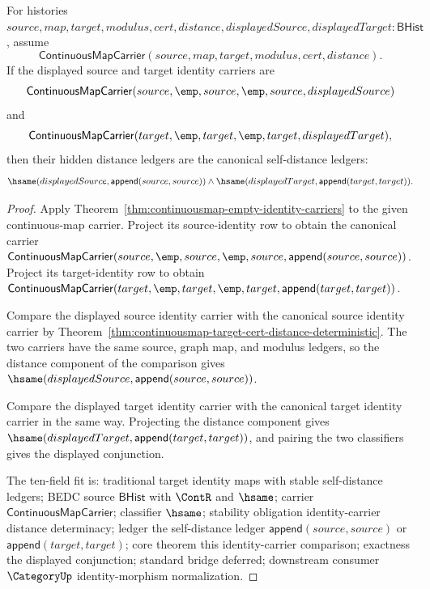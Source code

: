 \begin{theorem}
\label{thm:continuousmap-identity-carrier-distance-determinacy}
For histories
$source,map,target,modulus,cert,distance,displayedSource,displayedTarget:\mathsf{BHist}$,
assume
$$
\mathsf{ContinuousMapCarrier}(source,map,target,modulus,cert,distance).
$$
If the displayed source and target identity carriers are
$$
\mathsf{ContinuousMapCarrier}
(source,\emp,source,\emp,source,displayedSource)
$$
and
$$
\mathsf{ContinuousMapCarrier}
(target,\emp,target,\emp,target,displayedTarget),
$$
then their hidden distance ledgers are the canonical self-distance ledgers:
$$
\hsame(displayedSource,\mathsf{append}(source,source))\land
\hsame(displayedTarget,\mathsf{append}(target,target)).
$$
\end{theorem}
\begin{proof}
Apply Theorem~\ref{thm:continuousmap-empty-identity-carriers}
to the given continuous-map carrier. Project its source-identity row to obtain
the canonical carrier
$\mathsf{ContinuousMapCarrier}(source,\emp,source,\emp,source,\mathsf{append}(source,source))$.
Project its target-identity row to obtain
$\mathsf{ContinuousMapCarrier}(target,\emp,target,\emp,target,\mathsf{append}(target,target))$.

Compare the displayed source identity carrier with the canonical source identity
carrier by Theorem~\ref{thm:continuousmap-target-cert-distance-deterministic}.
The two carriers have the same source, graph map, and modulus ledgers, so the
distance component of the comparison gives
$\hsame(displayedSource,\mathsf{append}(source,source))$.

Compare the displayed target identity carrier with the canonical target identity
carrier in the same way. Projecting the distance component gives
$\hsame(displayedTarget,\mathsf{append}(target,target))$, and pairing the two
classifiers gives the displayed conjunction.

The ten-field fit is: traditional target identity maps with stable self-distance
ledgers; BEDC source $\mathsf{BHist}$ with $\ContR$ and $\hsame$; carrier
$\mathsf{ContinuousMapCarrier}$; classifier $\hsame$; stability obligation
identity-carrier distance determinacy; ledger the self-distance ledger
$\mathsf{append}(source,source)$ or $\mathsf{append}(target,target)$; core theorem
this identity-carrier comparison; exactness the displayed conjunction; standard
bridge deferred; downstream consumer $\CategoryUp$ identity-morphism
normalization.
\end{proof}

